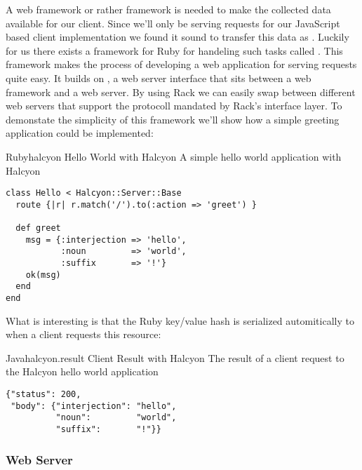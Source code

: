 A web framework or rather 
framework is needed to make the
collected data available for our client. Since we'll only be serving requests
for our JavaScript based client implementation we found it sound to transfer
this data as %
.
Luckily for us there exists a framework for Ruby for handeling such tasks
called %
.
This framework makes the process of developing a web application for serving
 requests quite easy. It builds on %
,
a web server interface that sits between a web framework and a web server. By
using Rack we can easily swap between different web servers that support the
protocoll mandated by Rack's interface layer. To demonstate the simplicity of
this framework we'll show how a simple greeting application could be
implemented:

\begin{scode}{Ruby}{halcyon}{%
  Hello World with Halcyon}{%
  A simple hello world application with Halcyon}
\begin{lstlisting}
class Hello < Halcyon::Server::Base
  route {|r| r.match('/').to(:action => 'greet') }
  
  def greet
    msg = {:interjection => 'hello',
           :noun         => 'world',
           :suffix       => '!'}
    ok(msg)
  end
end
\end{lstlisting}
\end{scode}

What is interesting is that the Ruby  key/value hash is serialized
automitically to  when a client requests this resource:

\begin{scode}{Java}{halcyon.result}{%
  Client Result with Halcyon}{%
  The result of a client request to the Halcyon hello world application}
\begin{lstlisting}
{"status": 200,
 "body": {"interjection": "hello",
          "noun":         "world",
          "suffix":       "!"}}
\end{lstlisting}
\end{scode}

\subsubsection{Web Server}

